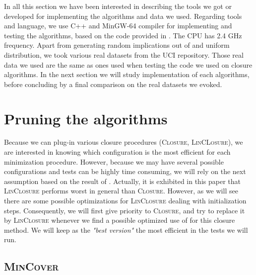 In all this section we have been interested in describing the tools we got or developed for implementing the algorithms and data we used. Regarding tools and language, we use C++ and MinGW-64 compiler for implementing and testing the algorithms, based on the code provided in \cite{bazhanov_optimizations_2014}. The CPU has 2.4 GHz frequency. Apart from generating random implications out
of  and uniform distribution, we took various real datasets from the UCI repository. Those real data we used are the same as ones used when testing the code we used on closure algorithms. In the next section we will study implementation of each algorithms, before concluding by a final comparison on 
the real datasets we evoked.

\section{Pruning the algorithms}

Because we can plug-in various closure procedures (\textsc{Closure}, \textsc{LinCLosure}), we are interested in knowing which configuration is
the most efficient for each minimization procedure. However, because we may
have several possible configurations and tests can be highly time consuming,
we will rely on the next assumption based on the result of \cite{bazhanov_optimizations_2014}. Actually, it is exhibited in this paper
that \textsc{LinClosure} performs worst in general than \textsc{Closure}. However, as we will see there are some possible optimizations for \textsc{LinClosure} dealing with initialization steps. Consequently, 
we will first give priority to \textsc{Closure}, and try to replace it 
by \textsc{LinClosure} whenever we find a possible optimized use of 
for this closure method. We will keep as the \textit{"best version"} the most efficient in the tests we will run.

\subsection{\textsc{MinCover}}


